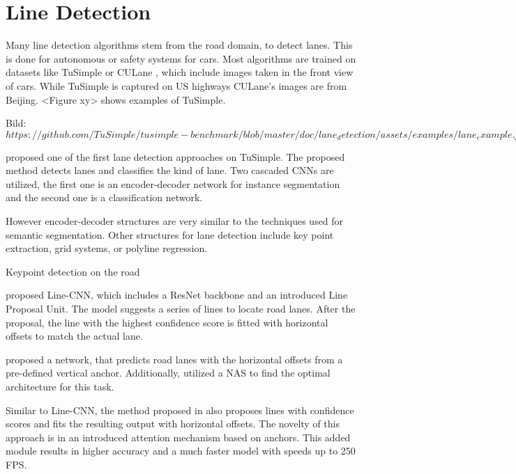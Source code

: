 \section{Line Detection}
\label{sec:lineDetection}

Many line detection algorithms stem from the road domain, to detect lanes.
This is done for autonomous or safety systems for cars.
Most algorithms are trained on datasets like TuSimple \cite{tuSimpleDataset} or CULane \cite{cuLaneDataset}, which include images taken in the front view of cars.
While TuSimple is captured on US highways CULane's images are from Beijing.
<Figure xy> shows examples of TuSimple.

\vspace{1cm}

Bild: $https://github.com/TuSimple/tusimple-benchmark/blob/master/doc/lane_detection/assets/examples/lane_example.jpg$

\vspace{1cm}

\cite{LaneDetectionCascadedCNNs2019} proposed one of the first lane detection approaches on TuSimple.
The proposed method detects lanes and classifies the kind of lane.
Two cascaded CNNs are utilized, the first one is an encoder-decoder network for instance segmentation and the second one is a classification network.

However encoder-decoder structures are very similar to the techniques used for semantic segmentation.
Other structures for lane detection include key point extraction, grid systems, or polyline regression.

Keypoint detection on the road

\cite{LineCNN2020} proposed Line-CNN, which includes a ResNet backbone and an introduced Line Proposal Unit.
The model suggests a series of lines to locate road lanes.
After the proposal, the line with the highest confidence score is fitted with horizontal offsets to match the actual lane.

\cite{CurveLaneNAS2020} proposed a network, that predicts road lanes with the horizontal offsets from a pre-defined vertical anchor.
Additionally, \cite{CurveLaneNAS2020} utilized a \ac{NAS} to find the optimal architecture for this task.

Similar to Line-CNN, the method proposed in \cite{KeepEyesOnLane2021} also proposes lines with confidence scores and fits the resulting output with horizontal offsets.
The novelty of this approach is in an introduced attention mechanism based on anchors.
This added module results in higher accuracy and a much faster model with speeds up to 250 \ac{FPS}.

